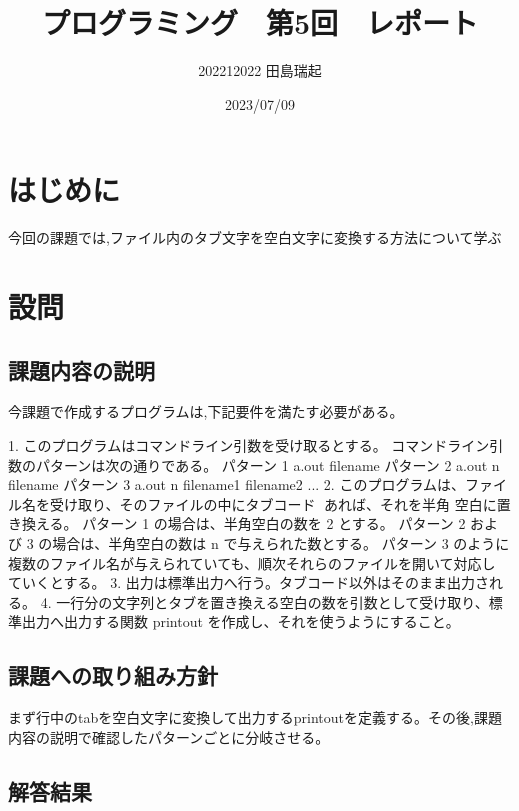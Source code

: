 \documentclass[fontsize = 10pt, paper= a4]{jlreq}
\begin{document}
\title{プログラミング　第5回　レポート}
\author{202212022 田島瑞起}
\date{2023/07/09}
\maketitle

\section{はじめに}
今回の課題では,ファイル内のタブ文字を空白文字に変換する方法について学ぶ
\section{設問}

\subsection{課題内容の説明}
今課題で作成するプログラムは,下記要件を満たす必要がある。

1. このプログラムはコマンドライン引数を受け取るとする。
コマンドライン引数のパターンは次の通りである。
パターン 1 a.out filename
パターン 2 a.out n filename
パターン 3 a.out n filename1 filename2 ...
2. このプログラムは、ファイル名を受け取り、そのファイルの中にタブコード \t があれば、それを半角
空白に置き換える。
パターン 1 の場合は、半角空白の数を 2 とする。
パターン 2 および 3 の場合は、半角空白の数は n で与えられた数とする。
パターン 3 のように複数のファイル名が与えられていても、順次それらのファイルを開いて対応し
ていくとする。
3. 出力は標準出力へ行う。タブコード以外はそのまま出力される。
4. 一行分の文字列とタブを置き換える空白の数を引数として受け取り、標準出力へ出力する関数
printout を作成し、それを使うようにすること。
\subsection{課題への取り組み方針}
まず行中のtabを空白文字に変換して出力するprintoutを定義する。その後,課題内容の説明で確認したパターンごとに分岐させる。
\subsection{解答結果}
\end{document}
